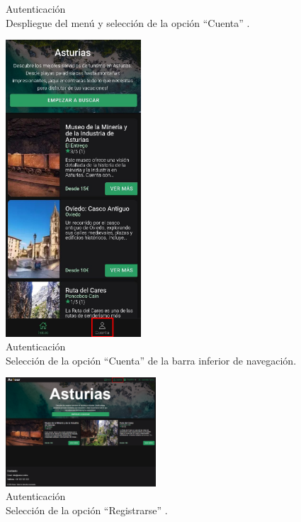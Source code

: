 \begin{figure}[H]
\begin{minipage}{0.45\textwidth}
		\caption{Autenticación \\ Despliegue del menú y selección de la opción “Cuenta” .}
		\label{fig:cuenta-movil}
	\end{minipage}
	\hfill
	\begin{minipage}{0.45\textwidth}
		\centering
		\includegraphics[width=0.45\textwidth]{7-Construccion/Manuales/app/P1-Registro.png}
		\caption{Autenticación \\ Selección de la opción “Cuenta” de la barra inferior de navegación.}
		\label{fig:cuenta-app}
	\end{minipage}
\end{figure}
\begin{figure}[H]
	\centering
	\includegraphics[width=0.5\textwidth]{7-Construccion/Manuales/web/cuenta opcion.png}
	\caption{Autenticación \\ Selección de la opción “Registrarse” .}
	\label{fig:cuenta-web}
\end{figure}

